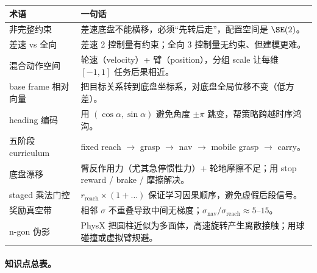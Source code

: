 \begin{center}
\small
\begin{tabular}{@{}ll@{}}
\toprule
术语 & 一句话 \\
\midrule
非完整约束 & 差速底盘不能横移，必须“先转后走”，配置空间是 $\SE(2)$。 \\
差速 vs 全向 & 差速 2 控制量有约束；全向 3 控制量无约束、但建模更难。 \\
混合动作空间 & 轮速（velocity）+ 臂（position），分组 scale 让每维 $[-1,1]$ 任务后果相近。 \\
base frame 相对向量 & 把目标关系转到底盘坐标系，对底盘全局位移不变（低方差）。 \\
heading 编码 & 用 $(\cos\alpha,\sin\alpha)$ 避免角度 $\pm\pi$ 跳变，帮策略跨越时序鸿沟。 \\
五阶段 curriculum & fixed reach $\to$ grasp $\to$ nav $\to$ mobile grasp $\to$ carry。 \\
底盘漂移 & 臂反作用力（尤其急停惯性力）+ 轮地摩擦不足；用 stop reward / brake / 摩擦解决。 \\
staged 乘法门控 & $r_{\text{reach}}\times(1+\dots)$ 保证学习因果顺序，避免虚假后段信号。 \\
奖励真空带 & 相邻 $\sigma$ 不重叠导致中间无梯度；$\sigma_{\text{nav}}/\sigma_{\text{reach}}\approx5$--$15$。 \\
n-gon 伪影 & PhysX 把圆柱近似为多面体，高速旋转产生离散接触；用球碰撞或虚拟臂规避。 \\
\bottomrule
\end{tabular}
\end{center}

\paragraph{知识点总表。}

